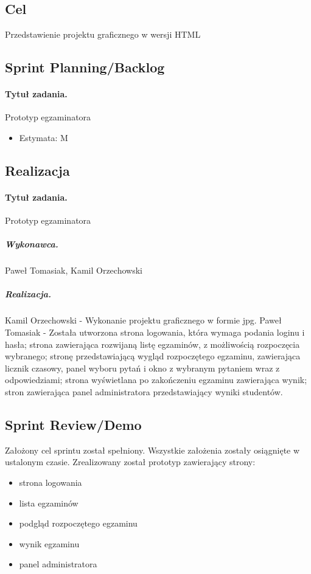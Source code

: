 \documentclass[a4paper]{article}
\begin{document}
\subsection{Cel} Przedstawienie projektu graficznego w wersji HTML
\subsection{Sprint Planning/Backlog}

\paragraph{Tytuł zadania.} Prototyp egzaminatora
\begin{itemize}
\item Estymata: M
\end{itemize}

\subsection{Realizacja}

\paragraph{Tytuł zadania.} Prototyp egzaminatora
\subparagraph{Wykonawca.} Paweł Tomasiak, Kamil Orzechowski
\subparagraph{Realizacja.} Kamil Orzechowski - Wykonanie projektu graficznego w formie jpg.
Paweł Tomasiak - Została utworzona strona logowania, która wymaga podania loginu i hasła; strona zawierająca rozwijaną listę egzaminów, z możliwością rozpoczęcia wybranego; stronę przedstawiającą wygląd rozpoczętego egzaminu, zawierająca licznik czasowy, panel wyboru pytań i okno z wybranym pytaniem wraz z odpowiedziami; strona wyświetlana po zakończeniu egzaminu zawierająca wynik; stron zawierająca panel administratora przedstawiający wyniki studentów.

\subsection{Sprint Review/Demo}
Założony cel sprintu został spełniony. Wszystkie założenia zostały osiągnięte w ustalonym czasie. Zrealizowany został prototyp zawierający strony:
\begin{itemize}
\item strona logowania
\item lista egzaminów
\item podgląd rozpoczętego egzaminu
\item wynik egzaminu 
\item panel administratora
\end{itemize}
\end{document}
